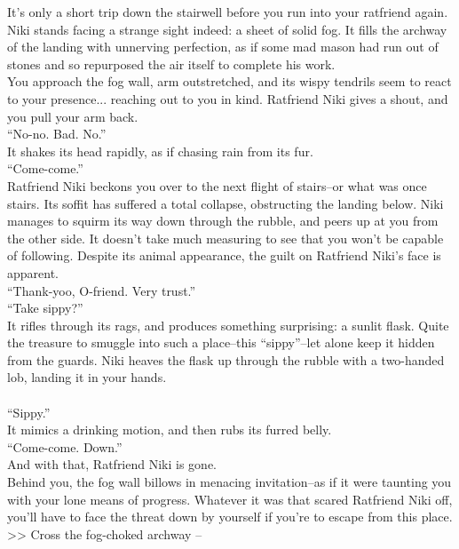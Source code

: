 It’s only a short trip down the stairwell before you run into your ratfriend again. Niki stands facing a strange sight indeed: a sheet of solid fog. It fills the archway of the landing with unnerving perfection, as if some mad mason had run out of stones and so repurposed the air itself to complete his work.\\

You approach the fog wall, arm outstretched, and its wispy tendrils seem to react to your presence... reaching out to you in kind. Ratfriend Niki gives a shout, and you pull your arm back.\\

“No-no. Bad. No.”\\
It shakes its head rapidly, as if chasing rain from its fur.\\

“Come-come.”\\
Ratfriend Niki beckons you over to the next flight of stairs--or what was once stairs. Its soffit has suffered a total collapse, obstructing the landing below. Niki manages to squirm its way down through the rubble, and peers up at you from the other side. It doesn’t take much measuring to see that you won’t be capable of following. Despite its animal appearance, the guilt on Ratfriend Niki’s face is apparent.\\

“Thank-yoo, O-friend. Very trust.”\\

“Take sippy?”\\
It rifles through its rags, and produces something surprising: a sunlit flask. Quite the treasure to smuggle into such a place--this “sippy”--let alone keep it hidden from the guards. Niki heaves the flask up through the rubble with a two-handed lob, landing it in your hands.\\
\\

“Sippy.”\\
It mimics a drinking motion, and then rubs its furred belly.\\

“Come-come. Down.”\\
And with that, Ratfriend Niki is gone.\\

Behind you, the fog wall billows in menacing invitation--as if it were taunting you with your lone means of progress. Whatever it was that scared Ratfriend Niki off, you’ll have to face the threat down by yourself if you’re to escape from this place.\\

>> Cross the fog-choked archway -- 